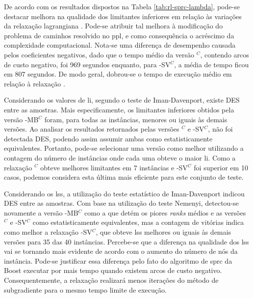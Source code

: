 De  acordo  com  os  resultados dispostos  na  Tabela  \ref{tab:rl-sprc-lambda},
pode-se destacar  melhora na qualidade  dos limitantes inferiores em  relação às
variações  da  relaxação lagrangiana  {\rlu}.  Pode-se  atribuir tal  melhora  à
modificação do problema de caminhos  resolvido no \gls{ppl}, e como consequência
o acréscimo da  complexidade computacional. Nota-se uma  diferença de desempenho
causada  pelos  coeficientes  negativos,  dado  que  o  tempo  médio  da  versão
{\rld}$^C$, contendo  arcos de custo  negativo, foi 969 segundos  enquanto, para
{\rld}-SV$^C$, a média de tempo ficou  em 807 segundos. De modo geral, dobrou-se
o tempo de execução médio em relação à relaxação {\rlu}.

Considerando os valores  de \gls{li}, segundo o teste  de Iman-Davenport, existe
DES entre  as amostras. Mais  especificamente, os limitantes  inferiores obtidos
pela versão {\rld}-MB$^C$ foram, para todas  as instâncias, menores ou iguais às
demais versões. Ao analisar os  resultados retornados pelas versões {\rld}$^C$ e
{\rld}-SV$^C$,  não  foi  detectada  DES,   podendo  assim  assumir  ambas  como
estatisticamente  equivalentes. Portanto,  pode-se  selecionar  uma versão  como
melhor utilizando  a contagem  do número  de instâncias onde  cada uma  obteve o
maior  \gls{li}. Como  a relaxação  {\rld}$^C$ obteve  melhores limitantes  em 7
instâncias  e {\rld}-SV$^C$  foi superior  em 10  casos, podemos  considera esta
última mais eficiente para este conjunto de teste.

Considerando os \gls{ls}s,  a utilização do teste  estatístico de Iman-Davenport
indicou  DES  entre as  amostras.  Com  base  na  utilização do  teste  Nemenyi,
detectou-se novamente  a versão {\rld}-MB$^C$  como a  que detém os  piores {\em
ranks}  médios e  as versões  {\rld}$^C$ e  {\rld}-SV$^C$ como  estatisticamente
equivalentes,  mas  a  contagem  de  vitórias indica  como  melhor  a  relaxação
{\rld}-SV$^C$, que obteve \gls{ls}s melhores ou iguais às demais versões para 35
das 40 instâncias. Percebe-se que a  diferença na qualidade dos \gls{ls}s vai se
tornando mais evidente  de acordo com o  aumento do número de  nós da instância.
Pode-se justificar essa diferença pelo fato  do algoritmo de \gls{sprc} da Boost
executar   por   mais   tempo   quando  existem   arcos   de   custo   negativo.
Consequentemente,   a  relaxação   realizará  menos   iterações  do   método  de
subgradiente para o mesmo tempo limite de execução.

\subsection{\rlt}

